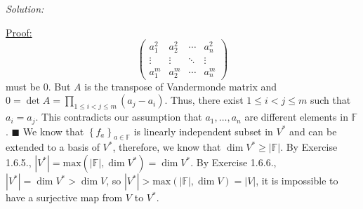 \documentclass[a4paper, 12pt]{article}
\newenvironment{solution}
    {\textit{Solution:}}
    {}
\newenvironment{claimproof}[1]{\par\noindent\underline{Proof:}\space#1}{\hfill $\blacksquare$}
\begin{document}
\begin{solution}
\begin{claimproof}
\[\begin{pmatrix}
	a_1^2 & a_2^2 & \cdots & a_n^2\\ 
	\vdots & \vdots & \ddots & \vdots \\ 
	a_1^m & a_2^m & \cdots & a_n^m
\end{pmatrix}\]
must be \(0\). But \(A\) is the transpose of Vandermonde matrix and \(0=\det A=\prod_{1\leq i<j\leq m}(a_j-a_i)\). Thus, there exist \(1\leq i<j\leq m \) such that \(a_i=a_j\). This contradicts our assumption 
that \(a_1,\ldots,a_n\) are different elements in \(\mathbb{F}\).
\end{claimproof}
We know that \(\left\{ f_a \right\}_{a\in \mathbb{F}}\) is linearly independent subset in \(V^*\) and can be extended to a basis of \(V^*\), therefore, we know that \(\dim V^*\geq |\mathbb{F}|\). By Exercise 1.6.5., 
\(|V^*|=\text{max}(|\mathbb{F}|,\dim V^*)=\dim V^*\). By Exercise 1.6.6., \(|V^*|=\dim V^*>\dim V\), so \(|V^*|>\text{max}(|\mathbb{F}|,\dim V)=|V|\), it is impossible to have a surjective map from \(V\) to \(V^*\).
\end{solution}
\end{document}
